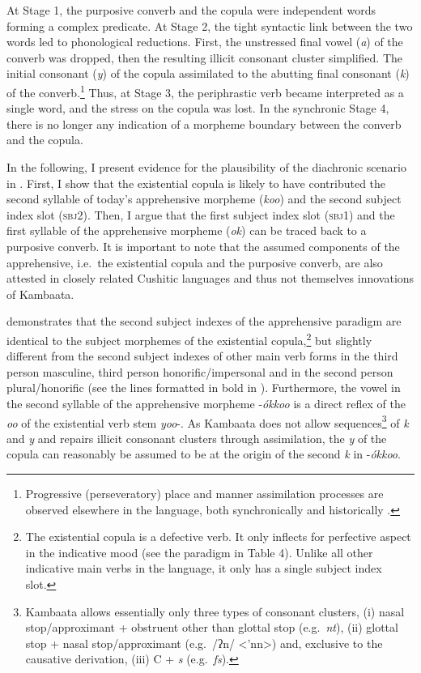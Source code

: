 \documentclass[output=paper,colorlinks,citecolor=brown,
]{langsci/langscibook}
\begin{document}
At Stage 1, the purposive converb and the copula were independent words forming a complex predicate. At Stage 2, the tight syntactic link between the two words led to phonological reductions. First, the unstressed final vowel (\textit{a}) of the converb was dropped, then the resulting illicit consonant cluster simplified. The initial consonant (\textit{y}) of the copula assimilated to the abutting final consonant (\textit{k}) of the converb.\footnote{Progressive (perseveratory) place and manner assimilation processes are observed elsewhere in the language, both synchronically and historically \citep[65, 71]{Treis2008}.} Thus, at Stage 3, the periphrastic verb became interpreted as a single word, and the stress on the copula was lost. In the synchronic Stage 4, there is no longer any indication of a morpheme boundary between the converb and the copula.

In the following, I present evidence for the plausibility of the diachronic scenario in . First, I show that the existential copula is likely to have contributed the second syllable of today's apprehensive morpheme (\textit{koo}) and the second subject index slot (\textsc{sbj2}). Then, I argue that the first subject index slot (\textsc{sbj1}) and the first syllable of the apprehensive morpheme (\textit{ok}) can be traced back to a purposive converb. It is important to note that the assumed components of the apprehensive,  i.e.\ the existential copula and the purposive converb, are also attested in closely related Cushitic languages and thus not themselves innovations of Kambaata.

 demonstrates that the second subject indexes of the apprehensive paradigm are identical to the subject morphemes of the existential copula,\footnote{The existential copula is a defective verb. It only inflects for perfective aspect in the indicative mood (see the paradigm in Table 4). Unlike all other indicative main verbs in the language, it only has a single subject index slot.} but slightly different from the second subject indexes of other main verb forms in the third person masculine, third person honorific\slash impersonal and in the second person plural\slash honorific (see the lines formatted in bold in ). Furthermore, the vowel in the second syllable of the apprehensive morpheme \nobreakdash-\textit{ókkoo} is a direct reflex of the \textit{oo} of the existential verb stem \textit{yoo}-. As Kambaata does not allow sequences\footnote{Kambaata allows essentially only three types of consonant clusters, (i) nasal stop\slash approximant + obstruent other than glottal stop (e.g.\ \textit{nt}), (ii) glottal stop + nasal stop\slash approximant (e.g.\ /ʔn/ <'nn>) and, exclusive to the causative derivation, (iii) C + \textit{s} (e.g.\ \textit{fs}).} of \textit{k} and \textit{y} and repairs illicit consonant clusters through assimilation, the \textit{y} of the copula can reasonably be assumed to be at the origin of the second \textit{k} in \nobreakdash-\textit{ókkoo}.
\end{document}
